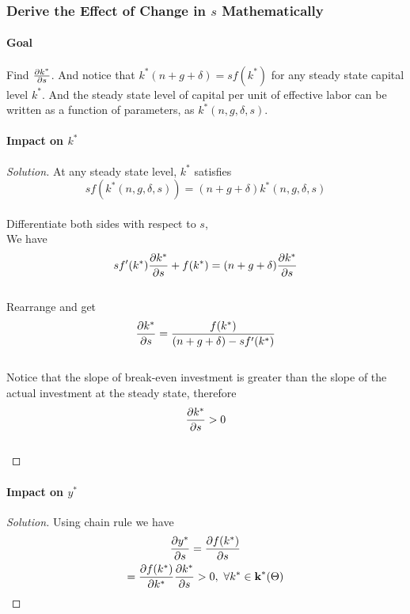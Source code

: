 \documentclass[11pt]{article}
\begin{document}
			\subsubsection{Derive the Effect of Change in $s$ Mathematically}
				\paragraph{Goal} Find $\frac{\partial{k^*}}{\partial{s}}$. And notice that $k^*(n+g+\delta) = sf(k^*)$ for any steady state capital level $k^*$. And the steady state level of capital per unit of effective labor can be written as a function of parameters, as $k^*(n, g, \delta, s)$.
				
			\paragraph{Impact on $k^*$}
			\begin{proof}[Solution]
				At any steady state level, $k^*$ satisfies \\
				\[sf(k^*(n,g,\delta,s)) = (n+g+\delta)k^*(n,g,\delta,s)\] \\
				Differentiate both sides with respect to $s$, \\
				We have \[sf'(k^*)\frac{\partial{k^*}}{\partial{s}} + f(k^*) = (n+g+\delta)\frac{\partial{k^*}}{\partial{s}}\] \\
				Rearrange and get \\
				\[
					\frac{\partial{k^*}}{\partial{s}} = \frac{f(k^*)}{(n+g+\delta) - sf'(k^*)}
				\] \\
				Notice that the slope of break-even investment is greater than the slope of the actual investment at the steady state, therefore \[\frac{\partial{k^*}}{\partial{s}} > 0\] \\
			\end{proof}
			
			\paragraph{Impact on $y^*$}
			\begin{proof}[Solution]
				Using chain rule we have
				\begin{gather*}
					\frac{\partial{y^*}}{\partial{s}} = \frac{\partial{f(k^*)}}{\partial{s}} \\
					= \frac{\partial{f(k^*)}}{\partial{k^*}} \frac{\partial{k^*}}{\partial{s}} > 0,\ \forall k^* \in \textbf{k}^*({\Theta})
				\end{gather*}
			\end{proof}
			
\end{document}
